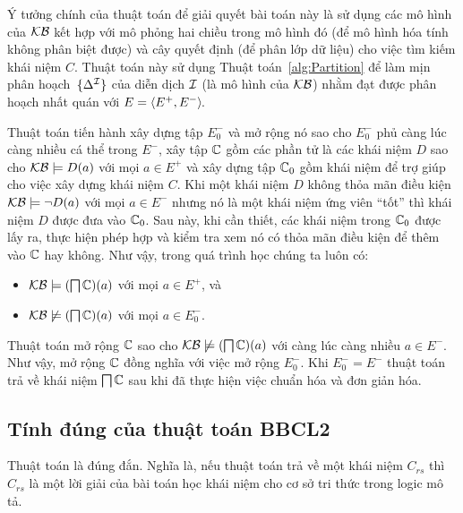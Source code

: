 Ý tưởng chính của thuật toán \BBCLearnS để giải quyết bài toán này là sử dụng các mô hình của $\mathcal{KB}$ kết hợp với mô phỏng hai chiều trong mô hình đó (để mô hình hóa tính không phân biệt được) và cây quyết định (để phân lớp dữ liệu) cho việc tìm kiếm khái niệm $C$. Thuật toán này sử dụng Thuật toán~\ref{alg:Partition} để làm mịn phân hoạch~$\{\Delta^{\mathcal{I}}\}$ của diễn dịch $\mathcal{I}$ (là mô hình của $\mathcal{KB}$) nhằm đạt được phân hoạch nhất quán với $E = \left\langle E^+, E^-\right\rangle\!$.

Thuật toán tiến hành xây dựng tập $E^-_0$ và mở rộng nó sao cho $E^-_0$ phủ càng lúc càng nhiều cá thể trong $E^-$, xây tập $\mathbb{C}$ gồm các phần tử là các khái niệm $D$ sao cho $\mathcal{KB} \models D(a)$ với mọi $a \in E^+$ và xây dựng tập $\mathbb{C}_0$ gồm khái niệm để trợ giúp cho việc xây dựng khái niệm $C$. 
Khi một khái niệm $D$ không thỏa mãn điều kiện $\mathcal{KB} \models \neg D(a)$ với mọi $a \in E^-$ nhưng nó là một khái niệm ứng viên ``tốt'' thì khái niệm $D$ được đưa vào $\mathbb{C}_0$. Sau này, khi cần thiết, các khái niệm trong $\mathbb{C}_0$ được lấy ra, thực hiện phép hợp và kiểm tra xem nó có thỏa mãn điều kiện để thêm vào $\mathbb{C}$ hay không. Như vậy, trong quá trình học chúng ta luôn có:
\begin{itemize}
	\item $\mathcal{KB} \models (\bigsqcap\mathbb{C})(a)$ với mọi $a \in E^+$, và
	\item $\mathcal{KB} \not\models (\bigsqcap\mathbb{C})(a)$ với mọi $a \in E^-_0$. 
\end{itemize}

Thuật toán mở rộng $\mathbb{C}$ sao cho $\mathcal{KB} \not\models(\bigsqcap\mathbb{C})(a)$ với càng lúc càng nhiều $a \in E^-$. Như vậy, mở rộng $\mathbb{C}$ đồng nghĩa với việc mở rộng $E^-_0$. Khi $E^-_0 = E^-$ thuật toán trả về khái niệm $\bigsqcap\mathbb{C}$ sau khi đã thực hiện việc chuẩn hóa và đơn giản hóa.

\subsection{Tính đúng của thuật toán BBCL2}

\begin{Proposition}
	Thuật toán \BBCLearnS là đúng đắn. Nghĩa là, nếu thuật toán \BBCLearnS trả về một khái niệm $C_{rs}$ thì $C_{rs}$ là một lời giải của bài toán học khái niệm cho cơ sở tri thức trong logic mô tả.\myend
\end{Proposition}

